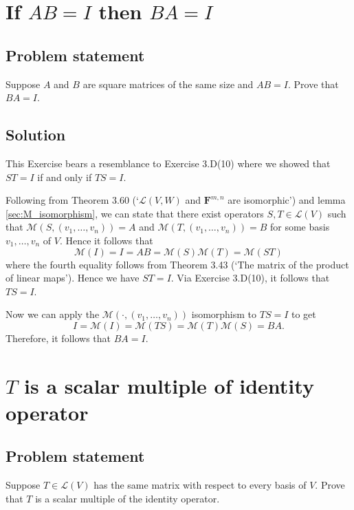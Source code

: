 \documentclass{article}
\begin{document}
\clearpage

\section{If $AB=I$ then $BA=I$}
\subsection*{Problem statement}
Suppose $A$ and $B$ are square matrices of the same size and $AB=I$. 
Prove that $BA=I$.

\subsection*{Solution}
This Exercise bears a resemblance to Exercise 3.D(10) where we showed that $ST=I$ if and only if $TS=I$. 

Following from Theorem 3.60 (`$\mathcal{L}(V,W)$ and $\mathbf{F}^{m,n}$ are isomorphic') and lemma \ref{sec:M_isomorphism}, we can state that there exist operators $S,T\in\mathcal{L}(V)$ such that $\mathcal{M}(S,(v_1,\ldots,v_n))=A$ and $\mathcal{M}(T,(v_1,\ldots,v_n))=B$ for some basis $v_1,\ldots,v_n$ of $V$. 
Hence it follows that 
\[\mathcal{M}(I)=I=AB=\mathcal{M}(S)\mathcal{M}(T)=\mathcal{M}(ST)\]
where the fourth equality follows from Theorem 3.43 (`The matrix of the product of linear maps'). 
Hence we have $ST=I$. 
Via Exercise 3.D(10), it follows that $TS=I$. 

Now we can apply the $\mathcal{M}(\cdot,(v_1,\ldots,v_n))$ isomorphism to $TS=I$ to get
\[I=\mathcal{M}(I)=\mathcal{M}(TS)=\mathcal{M}(T)\mathcal{M}(S)=BA.\]
Therefore, it follows that $BA=I$.

\clearpage

\section{$T$ is a scalar multiple of identity operator}
\subsection*{Problem statement}
Suppose $T\in\mathcal{L}(V)$ has the same matrix with respect to every basis of $V$. 
Prove that $T$ is a scalar multiple of the identity operator.
\end{document}
